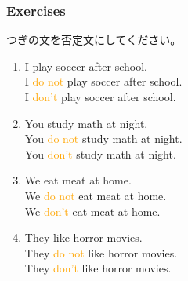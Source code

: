 \documentclass[aspectratio=169]{beamer}
\begin{document}
\begin{frame}[plain]\frametitle{Exercises}
 
つぎの文を否定文にしてください。
\begin{enumerate}
 \item I play soccer after school.\pause{}\hspace{63pt}{\footnotesize after school: 放課後に}\\\pause
       I \textcolor{orange}{do not} play soccer after school.\\\pause
       I \textcolor{orange}{don't} play soccer after school.\pause
 \item You study math at night.\pause\hspace{68pt}{\footnotesize study: 勉強する　math: 数学　at night: 夜に}\\\pause
       You \textcolor{orange}{do not} study math at night.\\\pause
       You \textcolor{orange}{don't} study math at night.\pause
 \item We eat meat at home.\pause\hspace{80pt}{\footnotesize eat: 食べる　meat: 肉}\\\pause
       We \textcolor{orange}{do not} eat meat at home.\\\pause
       We \textcolor{orange}{don't} eat meat at home.\pause
 \item They like horror movies.\pause\hspace{70pt}{\footnotesize horror movie: ホラー映画}\\\pause
       They \textcolor{orange}{do not} like horror movies.\\\pause
       They \textcolor{orange}{don't} like horror movies.
\end{enumerate}




\end{frame}
\end{document}
